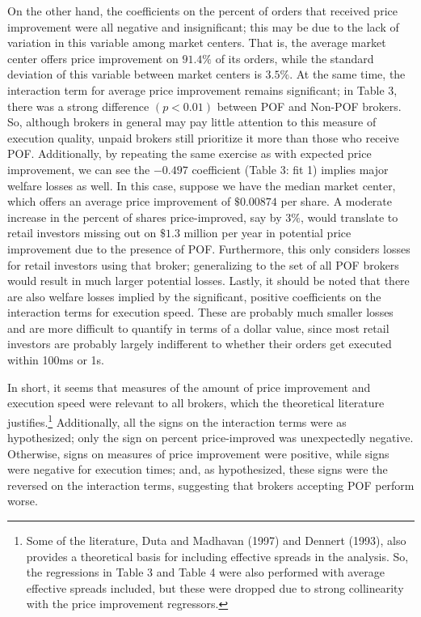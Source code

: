 \documentclass[12pt,a4paper]{article}
\begin{document}
On the other hand, the coefficients on the percent of orders that received price improvement were all negative and insignificant; this may be due to the lack of variation in this variable among market centers. That is, the average market center offers price improvement on $91.4\%$ of its orders, while the standard deviation of this variable between market centers is $3.5\%$. At the same time, the interaction term for average price improvement remains significant; in Table 3, there was a strong difference $(p < 0.01)$  between POF and Non-POF brokers. So, although brokers in general may pay little attention to this measure of execution quality, unpaid brokers still prioritize it more than those who receive POF. Additionally, by repeating the same exercise as with expected price improvement, we can see the $-0.497$ coefficient (Table 3: fit 1) implies major welfare losses as well. In this case, suppose we have the median market center, which offers an average price improvement of $\$0.00874$ per share. A moderate increase in the percent of shares price-improved, say by $3\%$, would translate to retail investors missing out on $\$1.3$ million per year in potential price improvement due to the presence of POF. Furthermore, this only considers losses for retail investors using that broker; generalizing to the set of all POF brokers would result in much larger potential losses. Lastly, it should be noted that there are also welfare losses implied by the significant, positive coefficients on the interaction terms for execution speed. These are probably much smaller losses and are more difficult to quantify in terms of a dollar value, since most retail investors are probably largely indifferent to whether their orders get executed within 100ms or 1s.  

In short, it seems that measures of the amount of price improvement and execution speed were relevant to all brokers, which the theoretical literature justifies.\footnote{ Some of the literature, Duta and Madhavan (1997) and Dennert (1993),  also provides a theoretical basis for including effective spreads in the analysis. So, the regressions in Table 3 and Table 4 were also performed with average effective spreads included, but these were dropped due to strong collinearity with the price improvement regressors.} Additionally, all the signs on the interaction terms were as hypothesized; only the sign on percent price-improved was unexpectedly negative. Otherwise, signs on measures of price improvement were positive, while signs were negative for execution times; and, as hypothesized, these signs were the reversed on the interaction terms, suggesting that brokers accepting POF perform worse.
\end{document}
